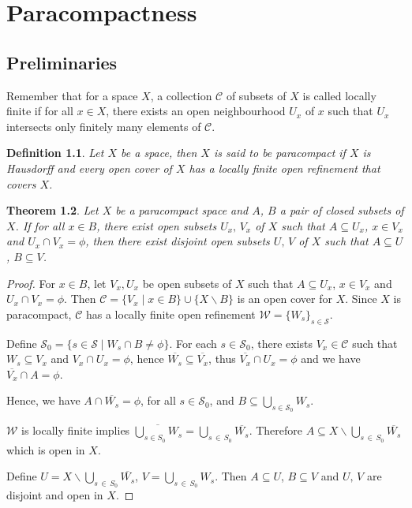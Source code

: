 \documentclass[12pt,oneside,english]{amsbook}
\numberwithin{equation}{section} %
\numberwithin{figure}{section} %
\theoremstyle{plain}
\numberwithin{section}{chapter}
\newtheorem{thm}{Theorem}[section]
\theoremstyle{plain}
\newtheorem{defn}[thm]{Definition}
\begin{document}
\chapter{Paracompactness}

\section{Preliminaries}

Remember that for a space $X$, a collection $\mathcal{C}$ of subsets of $X$ is called locally finite if for all $x \in X$, there exists an open neighbourhood $U_{x}$ of $x$ such that $U_{x}$ intersects only finitely many elements of $\mathcal{C}$.


\begin{defn}\label{def:paracompactness}
  Let $X$ be a space, then $X$ is said to be paracompact if $X$ is Hausdorff and every open cover of $X$ has a locally finite open refinement that covers $X$.
\end{defn}

\begin{thm} \label{thm:paracompact:1}
  Let $X$ be a paracompact space and $A$, $B$ a pair of closed subsets of $X$. If for all $x  \in  B$, there exist open subsets $U_{x}, \, V_{x}$ of $X$ such that $A \subseteq  U_{x}$, $x  \in  V_{x}$ and $U_{x} \cap V_{x} = \phi$, then there exist disjoint open subsets $U, \, V$ of $X$ such that $A  \subseteq  U$, $B  \subseteq  V$.
\end{thm}
\begin{proof}
  For $x  \in  B$, let $V_{x}, U_x$ be open subsets of $X$ such that $A  \subseteq  U_{x}$, $x  \in  V_{x}$ and $U_{x} \cap V_{x}  =  \phi$. Then $\mathcal{C}  =  \{V_{x}\; | \;  x  \in  B\} \cup \{X \backslash B \}$ is an open cover for $X$. Since $X$ is paracompact, $\mathcal{C}$ has a locally finite open refinement $\mathcal{W}  =  \{W_{s}\}_{s  \in  \mathcal{S}}$.

  Define $\mathcal{S}_{0}  =  \{s  \in  \mathcal{S}\; | \; W_{s} \cap B  \neq  \phi \}$. For each $s \in \mathcal{S}_0$, there exists $V_x \in \mathcal{C}$ such that $W_s \subseteq V_x$ and $V_{x} \cap U_{x} = \phi$, hence $\overline{W_{s}}  \subseteq  \overline{V_{x}}$, thus $\overline{V_{x}} \cap U_{x}  =  \phi$ and we have $\overline{V_{x}} \cap A  =  \phi$.

  Hence, we have $A \cap \overline{W_{s}}  =  \phi$, for all $s  \in  \mathcal{S}_0$, and $B  \subseteq  \bigcup_{s  \in  \mathcal{S}_0}W_s$.

  $\mathcal{W}$ is locally finite implies $\overline{\bigcup_{s  \in  S_{0}}W_{s}}  =  \bigcup_{s \, \in \, S_{0}}\overline{W_{s}}$. Therefore $A \subseteq  X \backslash \bigcup_{s \, \in \, S_{0}}\overline{W_{s}}$ which is open in $X$.

    Define $U =  X \backslash \bigcup_{s \, \in \, S_{0}}\overline{W_{s}}$, $V =  \bigcup_{s \, \in \, S_{0}}W_{s}$. Then $A \subseteq U$, $B \subseteq V$ and $U, \, V$ are disjoint and open in $X$.
\end{proof}
\end{document}
